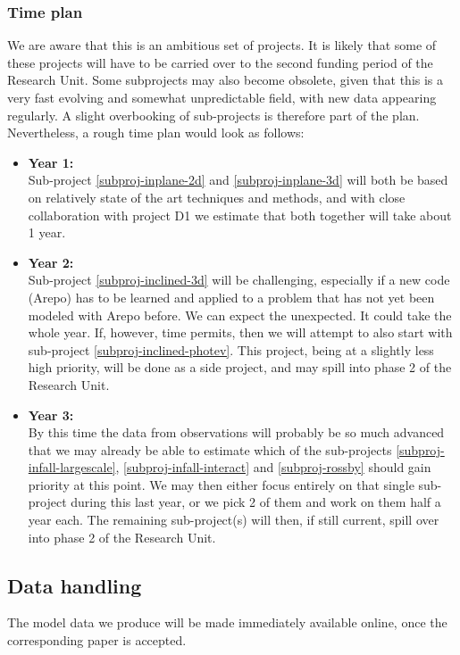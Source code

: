 \documentclass[10pt,fleqn,twoside,a4paper]{article}
\begin{document}
\subsubsection{Time plan}
We are aware that this is an ambitious set of projects. It is likely that
some of these projects will have to be carried over to the second funding
period of the Research Unit. Some subprojects may also become obsolete,
given that this is a very fast evolving and somewhat unpredictable field,
with new data appearing regularly. A slight overbooking of sub-projects is
therefore part of the plan. Nevertheless, a rough time plan would look as
follows:
\begin{itemize}
\item {\bf Year 1:}\\
  Sub-project \ref{subproj-inplane-2d} and \ref{subproj-inplane-3d} will both
  be based on relatively state of the art techniques and methods, and with
  close collaboration with project D1 we estimate that both together will
  take about 1 year.
\item {\bf Year 2:}\\
  Sub-project \ref{subproj-inclined-3d} will be challenging, especially if a
  new code (Arepo) has to be learned and applied to a problem that has not yet
  been modeled with Arepo before. We can expect the unexpected. It could take
  the whole year. If, however, time permits, then we will attempt to also 
  start with sub-project \ref{subproj-inclined-photev}. This project, being at a
  slightly less high priority, will be done as a side project, and may spill into
  phase 2 of the Research Unit.
\item {\bf Year 3:}\\
  By this time the data from observations will probably be so much advanced
  that we may already be able to estimate which of the sub-projects
  \ref{subproj-infall-largescale}, \ref{subproj-infall-interact} and \ref{subproj-rossby}
  should gain priority at this point. We may then either focus entirely on
  that single sub-project during this last year, or we pick 2 of them and
  work on them half a year each. The remaining sub-project(s) will then, if
  still current, spill over into phase 2 of the Research Unit.
\end{itemize}


\subsection{Data handling}
The model data we produce will be made immediately available online, once
the corresponding paper is accepted. 
\end{document}
